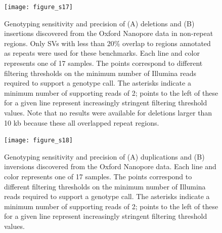 \documentclass[12pt]{article}
\newenvironment{cfigure}
	{\begin{figure} \centering}
	{\end{figure}}
\newenvironment{lsfigure}
	{\begin{landscape} \begin{figure} \centering}
	{\end{figure} \end{landscape}}
\begin{document}
\begin{lsfigure}
		\texttt{[image: figure\_s17]}

		\caption[Sensitivity and precision of Oxford Nanopore deletion and insertion genotyping in non-repeat regions]{
			Genotyping sensitivity and precision of (A) deletions and (B) insertions discovered from the Oxford Nanopore data in non-repeat regions. 
			Only SVs with less than 20\% overlap to regions annotated as repeats were used for these benchmarks. 
			Each line and color represents one of 17 samples. 
		The points correspond to different filtering thresholds on the minimum number of Illumina reads required to support a genotype call.
			The asterisks indicate a minimum number of supporting reads of 2; points to the left of these for a given line represent increasingly stringent filtering threshold values.
			Note that no results were available for deletions larger than 10 kb because these all overlapped repeat regions.
	}

		\label{fig_s17}
\end{lsfigure}

\clearpage%

\begin{cfigure}
	\texttt{[image: figure\_s18]}

	\caption[Sensitivity and precision of Oxford Nanopore duplication and inversion genotyping]{
		Genotyping sensitivity and precision of (A) duplications and (B) inversions discovered from the Oxford Nanopore data. 
		Each line and color represents one of 17 samples. 
		The points correspond to different filtering thresholds on the minimum number of Illumina reads required to support a genotype call.
		The asterisks indicate a minimum number of supporting reads of 2; points to the left of these for a given line represent increasingly stringent filtering threshold values.
	}

	\label{fig_s18}

\end{cfigure}

\clearpage%
\end{document}
